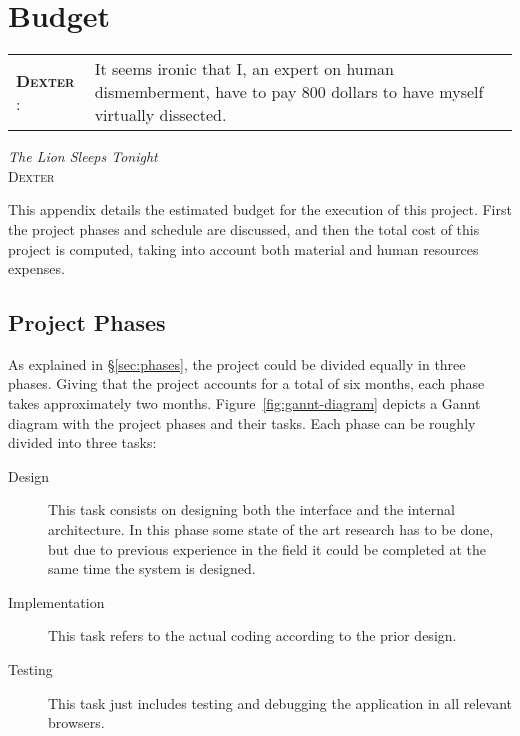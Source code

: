 \chapter{Budget} %
\label{cha:budget}

\setlength{\epigraphwidth}{9cm}
\renewcommand{\tabcolsep}{0em}

\epigraph{
\begin{tabular}{p{1.75cm}p{7cm}}
  \footnotesize{\textbf{\textsc{Dexter}} :}
    & It seems ironic that I, an expert on human dismemberment, have to pay 800 dollars to have myself virtually dissected. \\
\end{tabular}
\vspace{1em}
}{\textit{The Lion Sleeps Tonight}\\ \textsc{Dexter}}


\newpage

This appendix details the estimated budget for the execution of this project.
First the project phases and schedule are discussed, and then the total cost of this project is computed, taking into account both material and human resources expenses.

\section{Project Phases} %
\label{sec:project_phases}

As explained in \S\vref{sec:phases}, the project could be divided equally in three phases.
Giving that the project accounts for a total of six months, each phase takes approximately two months.
Figure~\vref{fig:gannt-diagram} depicts a Gannt diagram with the project phases and their tasks.
Each phase can be roughly divided into three tasks:

\begin{description}
  \item[Design] This task consists on designing both the interface and the internal architecture.
  In this phase some state of the art research has to be done, but due to previous experience in the field it could be completed at the same time the system is designed.
  \item[Implementation] This task refers to the actual coding according to the prior design.
  \item[Testing] This task just includes testing and debugging the application in all relevant browsers.
\end{description}

